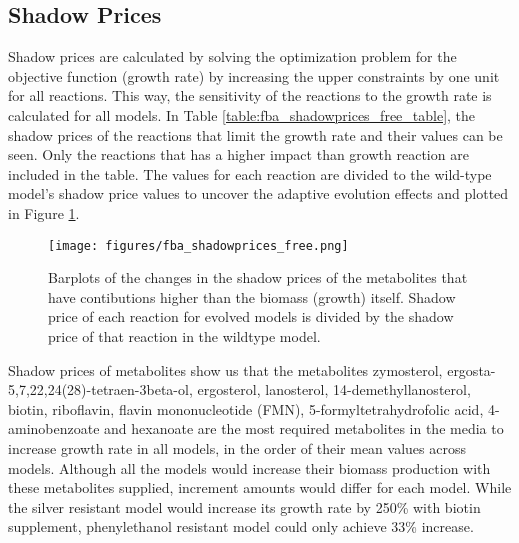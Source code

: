 \subsection{Shadow Prices}
Shadow prices are calculated by solving the optimization problem for the objective function (growth rate) by increasing the upper constraints by one unit for all reactions. This way, the sensitivity of the reactions to the growth rate is calculated for all models. In Table \ref{table:fba_shadowprices_free_table}, the shadow prices of the reactions that limit the growth rate and their values can be seen. Only the reactions that has a higher impact than growth reaction are included in the table. The values for each reaction are divided to the wild-type model's shadow price values to uncover the adaptive evolution effects and plotted in Figure \ref{fig:fba_shadowprices_free}.

\baselineskip


\begin{figure}[H]
  \begin{center}
  \texttt{[image: figures/fba\_shadowprices\_free.png]}
  \caption[Barplots of the changes in the shadow prices of the metabolites that have contibutions higher than the biomass (growth) itself. Shadow price of each reaction for evolved models is divided by the shadow price of that reaction in the wildtype model]{Barplots of the changes in the shadow prices of the metabolites that have contibutions higher than the biomass (growth) itself. Shadow price of each reaction for evolved models is divided by the shadow price of that reaction in the wildtype model.}
  \label{fig:fba_shadowprices_free}
  \end{center}
\end{figure}

Shadow prices of metabolites show us that the metabolites zymosterol, ergosta-5,7,22,24(28)-tetraen-3beta-ol, ergosterol, lanosterol, 14-demethyllanosterol, biotin, riboflavin, flavin mononucleotide (FMN), 5-formyltetrahydrofolic acid, 4-aminobenzoate and hexanoate are the most required metabolites in the media to increase growth rate in all models, in the order of their mean values across models. Although all the models would increase their biomass production with these metabolites supplied, increment amounts would differ for each model. While the silver resistant model would increase its growth rate by 250\% with biotin supplement, phenylethanol resistant model could only achieve 33\% increase.

